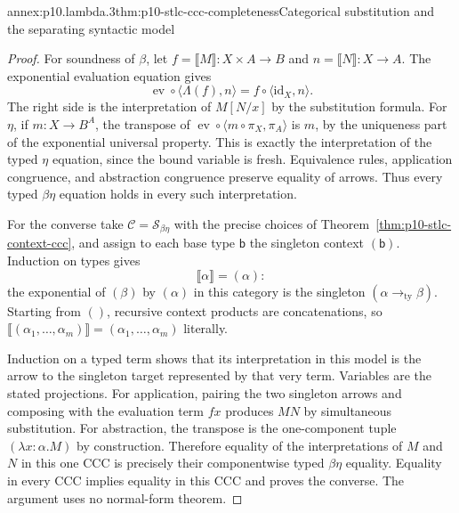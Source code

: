 \begin{annexitem}{annex:p10.lambda.3}{thm:p10-stlc-ccc-completeness}{Categorical substitution and the separating syntactic model}
\begin{proof}
For soundness of \(\beta\), let
\(f=\llbracket M\rrbracket:X\times A\to B\) and
\(n=\llbracket N\rrbracket:X\to A\).
The exponential evaluation equation gives
\[
           \operatorname{ev}\circ\langle\Lambda(f),n\rangle
                      = f\circ\langle\mathrm{id}_X,n\rangle.
\]
The right side is the interpretation of \(M[N/x]\) by the
substitution formula.  For \(\eta\), if \(m:X\to B^A\),
the transpose of
\(\operatorname{ev}\circ
 \langle m\circ\pi_X,\pi_A\rangle\) is \(m\), by the
uniqueness part of the exponential universal property.
This is exactly the interpretation of the typed \(\eta\)
equation, since the bound variable is fresh.
Equivalence rules, application congruence, and abstraction
congruence preserve equality of arrows.  Thus every typed
\(\beta\eta\) equation holds in every such interpretation.

For the converse take \(\mathcal C=\mathcal S_{\beta\eta}\)
with the precise choices of
Theorem~\ref{thm:p10-stlc-context-ccc}, and assign to each
base type \(\mathsf b\) the singleton context \((\mathsf b)\).
Induction on types gives
\[
                        \llbracket\alpha\rrbracket=(\alpha):
\]
the exponential of \((\beta)\) by \((\alpha)\) in this category
is the singleton
\((\alpha\mathbin{\to_{\mathrm{ty}}}\beta)\).
Starting from \(()\), recursive context products are
concatenations, so
\(\llbracket(\alpha_1,\ldots,\alpha_m)\rrbracket
   =(\alpha_1,\ldots,\alpha_m)\) literally.

Induction on a typed term shows that its interpretation in
this model is the arrow to the singleton target represented
by that very term.  Variables are the stated projections.
For application, pairing the two singleton arrows and
composing with the evaluation term \(fx\) produces \(MN\)
by simultaneous substitution.  For abstraction, the
transpose is the one-component tuple
\((\lambda x{:}\alpha.M)\) by construction.
Therefore equality of the interpretations of \(M\) and \(N\)
in this one CCC is precisely their componentwise typed
\(\beta\eta\) equality.  Equality in every CCC implies equality
in this CCC and proves the converse.  The argument uses no
normal-form theorem.
\end{proof}
\end{annexitem}
